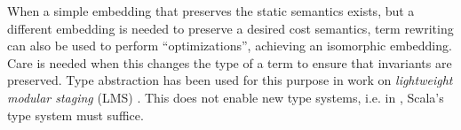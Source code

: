 \documentclass[10pt,preprint]{sigplanconf}
\begin{document}


When a simple embedding that preserves the static semantics exists, but a different  embedding is needed to preserve a desired cost semantics, term rewriting  can also be used to perform ``optimizations'', achieving an isomorphic embedding. Care is needed when this changes the type of a term to ensure that invariants are preserved. Type abstraction has been used for this purpose in work on \emph{lightweight modular staging} (LMS) \cite{Rompf:2012:LMS}. This does not enable new type systems, i.e. in \cite{Rompf:2012:LMS}, Scala's type system must suffice. %
\end{document}
